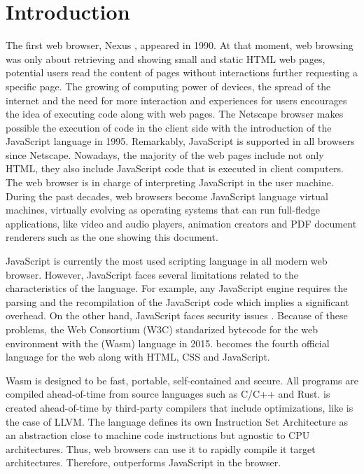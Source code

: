 \chapter{Introduction}
\label{chapter:intro}


The first web browser, Nexus \cite{nexus}, appeared in 1990.
At that moment, web browsing was only about retrieving and showing small and static HTML web pages, \ie potential users read the content of  pages without interactions further requesting a specific page.
The growing of computing power of devices, the spread of the internet and the need for more interaction and experiences for users encourages the idea of executing code along with web pages.
The Netscape browser makes possible the execution of code in the client side with the introduction of the JavaScript language in 1995.
Remarkably, JavaScript is supported in all browsers since Netscape.
Nowadays, the majority of the web pages include not only HTML, they also include JavaScript code that is executed in client computers.
The web browser is in charge of interpreting JavaScript in the user machine.
During the past decades, web browsers become JavaScript language virtual machines, virtually evolving as operating systems that can run full-fledge applications, like video and audio players, animation creators and PDF document renderers such as the one showing this document.

JavaScript is currently the most used scripting language in all modern web browser. 
However, JavaScript faces several limitations related to the characteristics of the language. For example, any JavaScript engine requires the parsing and the recompilation of the JavaScript code which implies a significant overhead.
On the other hand, JavaScript faces security issues \cite{10.1145/1190216.1190252}.
Because of these problems, the Web Consortium (W3C) standarized bytecode for the web environment with the \wasm (Wasm) language in 2015. 
\wasm becomes the fourth official language for the web along with HTML, CSS and JavaScript.

Wasm is designed to be fast, portable, self-contained and secure.
All \wasm programs are compiled ahead-of-time from source languages such as C/C++ and Rust.
\wasm is created ahead-of-time by third-party compilers that include optimizations, like is the case of LLVM.  
The \wasm language defines its own Instruction Set Architecture \cite{wasm_spec} as an abstraction close to machine code instructions but agnostic to CPU architectures. Thus,  web browsers can use it to rapidly compile it target architectures. Therefore, \wasm outperforms JavaScript in the browser.


